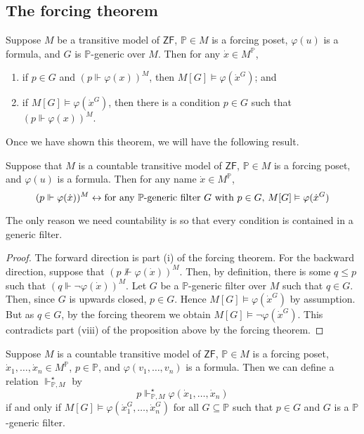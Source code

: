 \subsection{The forcing theorem}
\begin{theorem}
    Suppose \( M \) be a transitive model of \( \mathsf{ZF} \), \( \mathbb P \in M \) is a forcing poset, \( \varphi(u) \) is a formula, and \( G \) is \( \mathbb P \)-generic over \( M \).
    Then for any \( \dot x \in M^{\mathbb P} \),
    \begin{enumerate}
        \item if \( p \in G \) and \( (p \Vdash \varphi(x))^M \), then \( M[G] \vDash \varphi(\dot x^G) \); and
        \item if \( M[G] \vDash \varphi(\dot x^G) \), then there is a condition \( p \in G \) such that \( (p \Vdash \varphi(x))^M \).
    \end{enumerate}
\end{theorem}
Once we have shown this theorem, we will have the following result.
\begin{corollary}
    Suppose that \( M \) is a countable transitive model of \( \mathsf{ZF} \), \( \mathbb P \in M \) is a forcing poset, and \( \varphi(u) \) is a formula.
    Then for any name \( \dot x \in M^{\mathbb P} \),
    \[ (p \Vdash \varphi(\dot x))^M \leftrightarrow \text{for any \( \mathbb P \)-generic filter \( G \) with \( p \in G \), } M[G] \vDash \varphi(\dot x^G) \]
\end{corollary}
The only reason we need countability is so that every condition is contained in a generic filter.
\begin{proof}
    The forward direction is part (i) of the forcing theorem.
    For the backward direction, suppose that \( (p \nVdash \varphi(\dot x))^M \).
    Then, by definition, there is some \( q \leq p \) such that \( (q \Vdash \neg\varphi(\dot x))^M \).
    Let \( G \) be a \( \mathbb P \)-generic filter over \( M \) such that \( q \in G \).
    Then, since \( G \) is upwards closed, \( p \in G \).
    Hence \( M[G] \vDash \varphi(\dot x^G) \) by assumption.
    But as \( q \in G \), by the forcing theorem we obtain \( M[G] \vDash \neg\varphi(\dot x^G) \).
    This contradicts part (viii) of the proposition above by the forcing theorem.
\end{proof}
\begin{definition}
    Suppose \( M \) is a countable transitive model of \( \mathsf{ZF} \), \( \mathbb P \in M \) is a forcing poset, \( \dot x_1, \dots, \dot x_n \in M^{\mathbb P} \), \( p \in \mathbb P \), and \( \varphi(v_1, \dots, v_n) \) is a formula.
    Then we can define a relation \( \Vdash^\star_{\mathbb P, M} \) by
    \[ p \Vdash^\star_{\mathbb P, M} \varphi(\dot x_1, \dots, \dot x_n) \]
    if and only if \( M[G] \vDash \varphi(\dot x_1^G, \dots, \dot x_n^G) \) for all \( G \subseteq \mathbb P \) such that \( p \in G \) and \( G \) is a \( \mathbb P \)-generic filter.
\end{definition}
